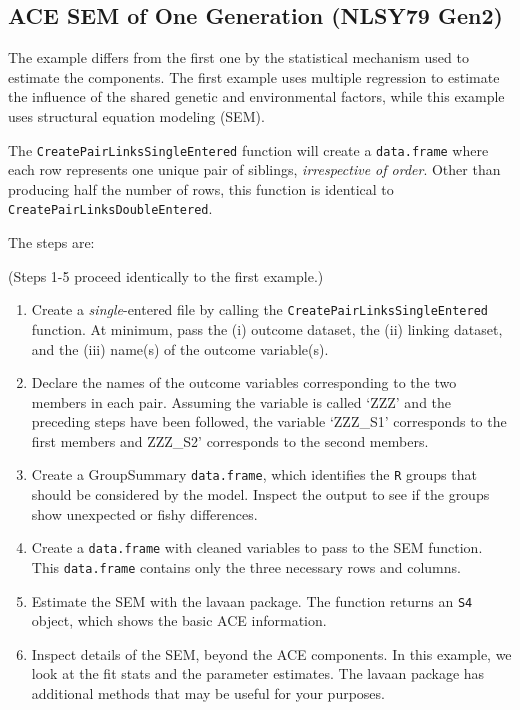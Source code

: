 \documentclass[smallextended]{svjour3}       %
\begin{document}
\hypertarget{ace-sem-of-one-generation-nlsy79-gen2}{%
\subsection{ACE SEM of One Generation (NLSY79
Gen2)}\label{ace-sem-of-one-generation-nlsy79-gen2}}

The example differs from the first one by the statistical mechanism used
to estimate the components. The first example uses multiple regression
to estimate the influence of the shared genetic and environmental
factors, while this example uses structural equation modeling (SEM).

The \texttt{CreatePairLinksSingleEntered} function will create a
\texttt{data.frame} where each row represents one unique pair of
siblings, \emph{irrespective of order}. Other than producing half the
number of rows, this function is identical to
\texttt{CreatePairLinksDoubleEntered}.

The steps are:

(Steps 1-5 proceed identically to the first example.)

\begin{enumerate}
\def\labelenumi{\arabic{enumi}.}
\setcounter{enumi}{5}
\item
  Create a \emph{single}-entered file by calling the
  \texttt{CreatePairLinksSingleEntered} function. At minimum, pass the
  (i) outcome dataset, the (ii) linking dataset, and the (iii) name(s)
  of the outcome variable(s).
\item
  Declare the names of the outcome variables corresponding to the two
  members in each pair. Assuming the variable is called `ZZZ' and the
  preceding steps have been followed, the variable `ZZZ\_S1' corresponds
  to the first members and ZZZ\_S2' corresponds to the second members.
\item
  Create a GroupSummary \texttt{data.frame}, which identifies the
  \texttt{R} groups that should be considered by the model. Inspect the
  output to see if the groups show unexpected or fishy differences.
\item
  Create a \texttt{data.frame} with cleaned variables to pass to the SEM
  function. This \texttt{data.frame} contains only the three necessary
  rows and columns.
\item
  Estimate the SEM with the lavaan package. The function returns an
  \texttt{S4} object, which shows the basic ACE information.
\item
  Inspect details of the SEM, beyond the ACE components. In this
  example, we look at the fit stats and the parameter estimates. The
  lavaan package has additional methods that may be useful for your
  purposes.
\end{enumerate}
\end{document}
